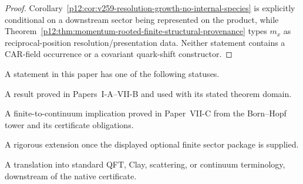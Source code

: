 \documentclass[12pt,a4paper]{article}
\begin{document}
\begin{proof}
Corollary~\ref{p12:cor:v259-resolution-growth-no-internal-species} is explicitly
conditional on a downstream sector being represented on the product, while
Theorem~\ref{p12:thm:momentum-rooted-finite-structural-provenance} types
$m_x$ as reciprocal-position resolution/presentation data.  Neither statement
contains a CAR-field occurrence or a covariant quark-shift constructor.
\end{proof}

\begin{definition}
\label{p12:def:status-classes}
A statement in this paper has one of the following statuses.
\begin{description}[leftmargin=3.4em]
\item[Imported.] A result proved in Papers~I-A--VII-B and used with its stated theorem domain.
\item[Native certificate.] A finite-to-continuum implication proved in Paper~VII-C from the Born--Hopf tower and its certificate obligations.
\item[Sector extension.] A rigorous extension once the displayed optional finite sector package is supplied.
\item[Comparison/export.] A translation into standard QFT, Clay, scattering, or continuum terminology, downstream of the native certificate.
\end{description}
\end{definition}
\end{document}
